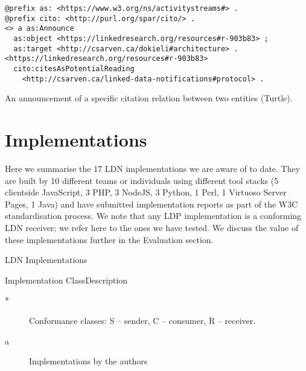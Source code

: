 \documentclass[a4paper]{llncs}
\begin{document}
                                    
                                        \begin{verbatim}@prefix as: <https://www.w3.org/ns/activitystreams#> .
@prefix cito: <http://purl.org/spar/cito/> .
<> a as:Announce
  as:object <https://linkedresearch.org/resources#r-903b83> ;
  as:target <http://csarven.ca/dokieli#architecture> .
<https://linkedresearch.org/resources#r-903b83>
  cito:citesAsPotentialReading
    <http://csarven.ca/linked-data-notifications#protocol> .\end{verbatim}
                                        An announcement of a specific citation relation between two entities (Turtle).
                                    
                                
                            
                        
                    

                    
                        \section{Implementations}
  \label{implementations}

                        
                            
\par Here we summarise the 17 LDN implementations we are aware of to date. They are built by 10 different teams or individuals using different tool stacks (5 clientside JavaScript, 3 PHP, 3 NodeJS, 3 Python, 1 Perl, 1 Virtuoso Server Pages, 1 Java) and have submitted \empty implementation reports as part of the W3C standardisation process. We note that any \empty LDP implementation is a conforming LDN receiver; we refer here to the ones we have tested. We discuss the value of these implementations further in the \empty Evaluation section.

                            
                                LDN Implementations
                                
                                    
                                        Implementation
                                        Class\empty *
                                        Description
                                    
                                
                                
                                    
                                        \begin{description}
  \item[*] Conformance classes: S – sender, C – consumer, R – receiver.\item[a] Implementations by the authors
    \end{description}
  
\end{document}
